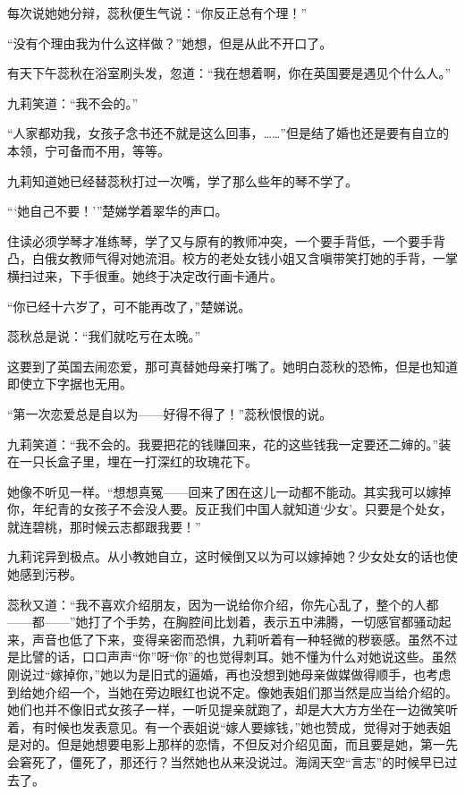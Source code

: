 \par 每次说她她分辩，蕊秋便生气说：“你反正总有个理！”
\par “没有个理由我为什么这样做？”她想，但是从此不开口了。
\par 有天下午蕊秋在浴室刷头发，忽道：“我在想着啊，你在英国要是遇见个什么人。”
\par 九莉笑道：“我不会的。”
\par “人家都劝我，女孩子念书还不就是这么回事，……”但是结了婚也还是要有自立的本领，宁可备而不用，等等。
\par 九莉知道她已经替蕊秋打过一次嘴，学了那么些年的琴不学了。
\par “‘她自己不要！'”楚娣学着翠华的声口。
\par 住读必须学琴才准练琴，学了又与原有的教师冲突，一个要手背低，一个要手背凸，白俄女教师气得对她流泪。校方的老处女钱小姐又含嗔带笑打她的手背，一掌横扫过来，下手很重。她终于决定改行画卡通片。
\par “你已经十六岁了，可不能再改了，”楚娣说。
\par 蕊秋总是说：“我们就吃亏在太晚。”
\par 这要到了英国去闹恋爱，那可真替她母亲打嘴了。她明白蕊秋的恐怖，但是也知道即使立下字据也无用。
\par “第一次恋爱总是自以为——好得不得了！”蕊秋恨恨的说。
\par 九莉笑道：“我不会的。我要把花的钱赚回来，花的这些钱我一定要还二婶的。”装在一只长盒子里，埋在一打深红的玫瑰花下。
\par 她像不听见一样。“想想真冤——回来了困在这儿一动都不能动。其实我可以嫁掉你，年纪青的女孩子不会没人要。反正我们中国人就知道‘少女’。只要是个处女，就连碧桃，那时候云志都跟我要！”
\par 九莉诧异到极点。从小教她自立，这时候倒又以为可以嫁掉她？少女处女的话也使她感到污秽。
\par 蕊秋又道：“我不喜欢介绍朋友，因为一说给你介绍，你先心乱了，整个的人都——都——”她打了个手势，在胸腔间比划着，表示五中沸腾，一切感官都骚动起来，声音也低了下来，变得亲密而恐惧，九莉听着有一种轻微的秽亵感。虽然不过是比譬的话，口口声声“你”呀“你”的也觉得刺耳。她不懂为什么对她说这些。虽然刚说过“嫁掉你，”她以为是旧式的逼婚，再也没想到她母亲做媒做得顺手，也考虑到给她介绍一个，当她在旁边眼红也说不定。像她表姐们那当然是应当给介绍的。她们也并不像旧式女孩子一样，一听见提亲就跑了，却是大大方方坐在一边微笑听着，有时候也发表意见。有一个表姐说“嫁人要嫁钱，”她也赞成，觉得对于她表姐是对的。但是她想要电影上那样的恋情，不但反对介绍见面，而且要是她，第一先会窘死了，僵死了，那还行？当然她也从来没说过。海阔天空“言志”的时候早已过去了。
